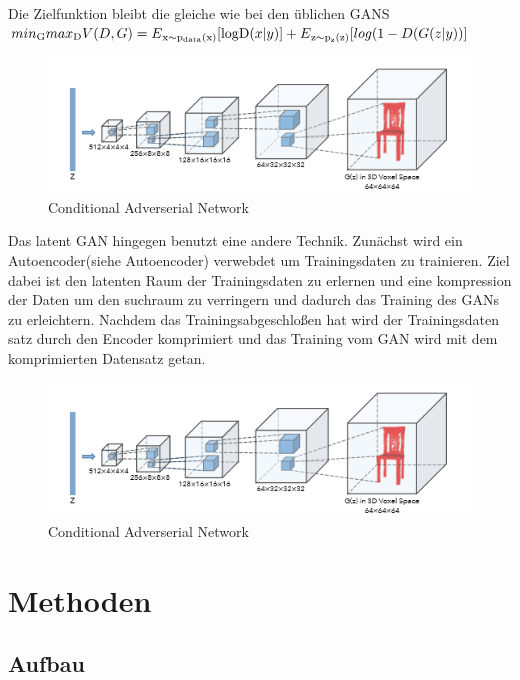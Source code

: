 \documentclass{llncs}
\begin{document}
Die Zielfunktion bleibt die gleiche wie bei den üblichen GANS 
\begin{math}
min\textsubscript{G} max\textsubscript{D}V(D,G)=E\textsubscript{x$\sim$p\textsubscript{data}(x)}[\log $D$(x|y)]  + E\textsubscript{z$\sim$p\textsubscript{z}(z)}[log(1-D(G(z|y))]           
\end{math}

\begin{figure}[htbp] 
	\centering
	\includegraphics[width=1.2\textwidth]{3dgan.png}
	\caption{Conditional Adverserial Network}
	\label{fig:Bild2}
\end{figure}
\cite{3d}

Das latent GAN hingegen benutzt eine andere Technik. Zunächst wird ein Autoencoder(siehe Autoencoder) verwebdet um Trainingsdaten zu trainieren. Ziel dabei ist den latenten Raum der Trainingsdaten zu erlernen und eine kompression der Daten um den suchraum zu verringern und dadurch das Training des GANs zu erleichtern. Nachdem das Trainingsabgeschloßen hat wird der Trainingsdaten satz durch den Encoder komprimiert und das Training vom GAN wird mit dem komprimierten Datensatz getan. 

\begin{figure}[htbp] 
	\centering
	\includegraphics[width=1.2\textwidth]{3dgan.png}
	\caption{Conditional Adverserial Network}
	\label{fig:Bild2}
\end{figure}
\cite{3d}

\section{Methoden}
\subsection{Aufbau}
\end{document}

